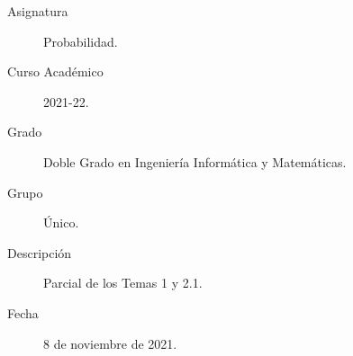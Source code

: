 \documentclass[12pt]{article}
\begin{document}

    
    

    \begin{description}
        \item[Asignatura] Probabilidad.
        \item[Curso Académico] 2021-22.
        \item[Grado] Doble Grado en Ingeniería Informática y Matemáticas.
        \item[Grupo] Único.
        \item[Descripción] Parcial de los Temas 1 y 2.1.
        \item[Fecha] 8 de noviembre de 2021.
    
    \end{description}
    \newpage
\end{document}
